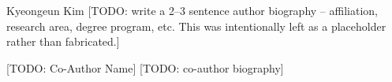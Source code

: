 \documentclass[journal,twocolumn]{IEEEtran}
\begin{document}














\begin{IEEEbiography}{Kyeongeun Kim}
[TODO: write a 2--3 sentence author biography -- affiliation, research area, degree program, etc. This was intentionally left as a placeholder rather than fabricated.]
\end{IEEEbiography}

\begin{IEEEbiography}{[TODO: Co-Author Name]}
[TODO: co-author biography]
\end{IEEEbiography}
\end{document}
